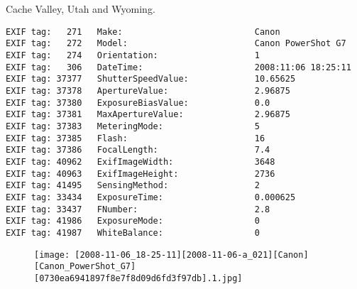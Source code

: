 \section{\protect{}}
\noindent Cache Valley, Utah and Wyoming.
\noindent
\begin{lstlisting}
EXIF tag:   271   Make:                          Canon
EXIF tag:   272   Model:                         Canon PowerShot G7
EXIF tag:   274   Orientation:                   1
EXIF tag:   306   DateTime:                      2008:11:06 18:25:11
EXIF tag: 37377   ShutterSpeedValue:             10.65625
EXIF tag: 37378   ApertureValue:                 2.96875
EXIF tag: 37380   ExposureBiasValue:             0.0
EXIF tag: 37381   MaxApertureValue:              2.96875
EXIF tag: 37383   MeteringMode:                  5
EXIF tag: 37385   Flash:                         16
EXIF tag: 37386   FocalLength:                   7.4
EXIF tag: 40962   ExifImageWidth:                3648
EXIF tag: 40963   ExifImageHeight:               2736
EXIF tag: 41495   SensingMethod:                 2
EXIF tag: 33434   ExposureTime:                  0.000625
EXIF tag: 33437   FNumber:                       2.8
EXIF tag: 41986   ExposureMode:                  0
EXIF tag: 41987   WhiteBalance:                  0

\end{lstlisting}
\clearpage
\begin{figure}
\raggedleft
\texttt{[image: [2008-11-06\_18-25-11][2008-11-06-a\_021][Canon][Canon\_PowerShot\_G7][0730ea6941897f8e7f8d09d6fd3f97db].1.jpg]}
\end{figure}


\clearpage
